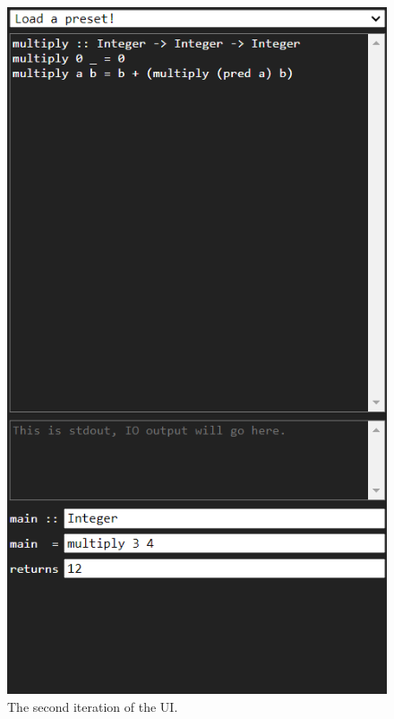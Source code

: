 \begin{figure}
\begin{minipage}[b]{0.45\textwidth}
        \includegraphics[width=\textwidth]{chapters/5-implementation/images/new.png}
        \caption{The second iteration of the UI.}
        \label{fig:new-ui}
    \end{minipage}
\end{figure}